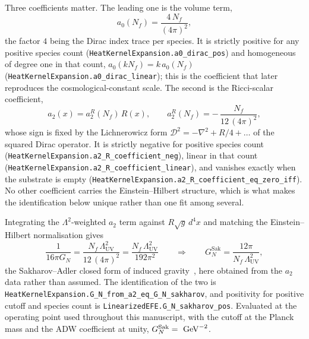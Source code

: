 \documentclass[aps,prd,nofootinbib,superscriptaddress,12pt]{revtex4-2}
\DeclareRobustCommand{\lb}{\discretionary{}{}{}}
\begin{document}
Three coefficients matter. The leading one is the volume term,
\begin{equation}
\label{eq:a0}
a_{0}(N_f) = \frac{4\,N_f}{(4\pi)^{2}},
\end{equation}
the factor $4$ being the Dirac index trace per species. It is strictly
positive for any positive species count
(\texttt{Heat\lb{}Kernel\lb{}Expansion.\lb{}a0\_\lb{}dirac\_\lb{}pos}) and homogeneous of degree one
in that count, $a_{0}(kN_f) = k\,a_{0}(N_f)$
(\texttt{Heat\lb{}Kernel\lb{}Expansion.\lb{}a0\_\lb{}dirac\_\lb{}linear}); this is the coefficient
that later reproduces the cosmological-constant scale. The second is the
Ricci-scalar coefficient,
\begin{equation}
\label{eq:a2}
a_{2}(x) = a_{2}^{R}(N_f)\,R(x),
\qquad
a_{2}^{R}(N_f) = -\,\frac{N_f}{12\,(4\pi)^{2}},
\end{equation}
whose sign is fixed by the Lichnerowicz form $\mathcal{D}^{2} = -\nabla^{2}
+ R/4 + \dots$ of the squared Dirac operator. It is strictly negative for
positive species count
(\texttt{Heat\lb{}Kernel\lb{}Expansion.\lb{}a2\_\lb{}R\_\lb{}coefficient\_\lb{}neg}), linear in that
count (\texttt{Heat\lb{}Kernel\lb{}Expansion.\lb{}a2\_\lb{}R\_\lb{}coefficient\_\lb{}linear}), and
vanishes exactly when the substrate is empty
(\texttt{Heat\lb{}Kernel\lb{}Expansion.\lb{}a2\_\lb{}R\_\lb{}coefficient\_\lb{}eq\_\lb{}zero\_\lb{}iff}). No other
coefficient carries the Einstein--Hilbert structure, which is what makes
the identification below unique rather than one fit among several.

Integrating the $\Lambda^{2}$-weighted $a_{2}$ term against
$R\sqrt{g}\,d^{4}x$ and matching the Einstein--Hilbert normalisation gives
\begin{equation}
\label{eq:sakharov-closed-form}
\frac{1}{16\pi G_N} = \frac{N_f\,\Lambda_{\mathrm{UV}}^{2}}{12\,(4\pi)^{2}}
= \frac{N_f\,\Lambda_{\mathrm{UV}}^{2}}{192\pi^{2}}
\qquad\Longrightarrow\qquad
G_N^{\mathrm{Sak}} = \frac{12\pi}{N_f\,\Lambda_{\mathrm{UV}}^{2}},
\end{equation}
the Sakharov--Adler closed form of induced
gravity~\cite{Sakharov1968,Adler1980}, here obtained from the $a_{2}$ data
rather than assumed. The identification of the two is
\texttt{Heat\lb{}Kernel\lb{}Expansion.\lb{}G\_\lb{}N\_\lb{}from\_\lb{}a2\_\lb{}eq\_\lb{}G\_\lb{}N\_\lb{}sakharov}, and
positivity for positive cutoff and species count is
\texttt{Linearized\lb{}EFE.\lb{}G\_\lb{}N\_\lb{}sakharov\_\lb{}pos}. Evaluated at the operating
point used throughout this manuscript, with the cutoff at the Planck mass
and the ADW coefficient at unity,
$G_N^{\mathrm{Sak}} = \unskip\
\mathrm{GeV}^{-2}$.
\end{document}
